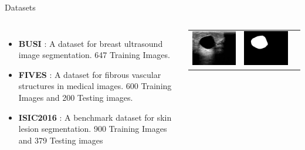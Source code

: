 \documentclass[aspectratio=169,xcolor=dvipsnames]{beamer}
\newcommand{\itemvtab}{\setlength{\itemsep}{0.3cm}}
\begin{document}
\begin{frame}{Datasets}
    \begin{columns}[c]
        \begin{itemize}
            \itemvtab
            \item  \textbf{BUSI} \cite{al2020dataset}: A dataset for breast ultrasound image segmentation. 647 Training Images.
            \item \textbf{FIVES} \cite{jin2022fives}: A dataset for fibrous vascular structures in medical images. 600 Training Images and 200 Testing images.
            \item \textbf{ISIC2016} \cite{isic2016dataset}: A benchmark dataset for skin lesion segmentation. 900 Training Images and 379 Testing images
        \end{itemize}
        

        \centering
        \begin{tabular}{ccc}
            \includegraphics[width=.3\textwidth, height=.3\textwidth]{figures/BUSI/images/benign (9).png} & 
            \includegraphics[width=.3\textwidth, height=.3\textwidth]{figures/BUSI/mask/benign (9)_mask.png} \\
            

\end{tabular}
\end{columns}
\end{frame}
\end{document}
